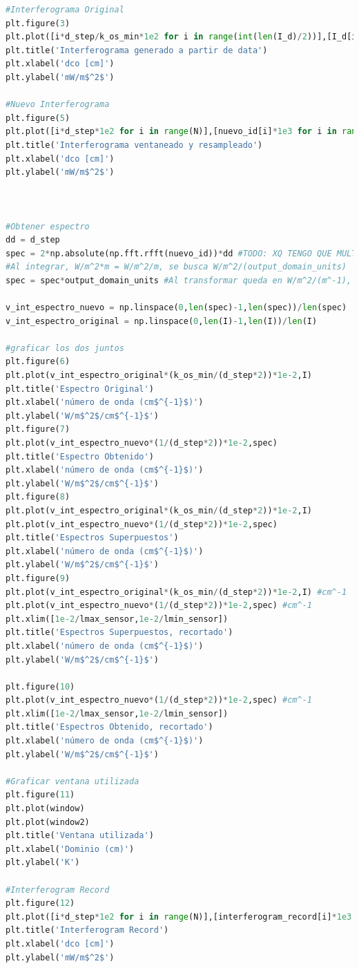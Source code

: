 \documentclass[11pt,titlepage]{article}
\begin{document}
\begin{lstlisting}[language=Python, caption=Python example]
#Interferograma Original
plt.figure(3)
plt.plot([i*d_step/k_os_min*1e2 for i in range(int(len(I_d)/2))],[I_d[i]*1e3 for i in range(int(len(I_d)/2))])
plt.title('Interferograma generado a partir de data')
plt.xlabel('dco [cm]')
plt.ylabel('mW/m$^2$')

#Nuevo Interferograma
plt.figure(5)
plt.plot([i*d_step*1e2 for i in range(N)],[nuevo_id[i]*1e3 for i in range(N)])
plt.title('Interferograma ventaneado y resampleado')
plt.xlabel('dco [cm]')
plt.ylabel('mW/m$^2$')



#Obtener espectro
dd = d_step
spec = 2*np.absolute(np.fft.rfft(nuevo_id))*dd #TODO: XQ TENGO QUE MULTIPLICAR POR DOS?
#Al integrar, W/m^2*m = W/m^2/m, se busca W/m^2/(output_domain_units)
spec = spec*output_domain_units #Al transformar queda en W/m^2/(m^-1), convertir en W/m^2/(output_domain_units)

v_int_espectro_nuevo = np.linspace(0,len(spec)-1,len(spec))/len(spec)
v_int_espectro_original = np.linspace(0,len(I)-1,len(I))/len(I)

#graficar los dos juntos
plt.figure(6)
plt.plot(v_int_espectro_original*(k_os_min/(d_step*2))*1e-2,I)
plt.title('Espectro Original')
plt.xlabel('número de onda (cm$^{-1}$)')
plt.ylabel('W/m$^2$/cm$^{-1}$')
plt.figure(7)
plt.plot(v_int_espectro_nuevo*(1/(d_step*2))*1e-2,spec)
plt.title('Espectro Obtenido')
plt.xlabel('número de onda (cm$^{-1}$)')
plt.ylabel('W/m$^2$/cm$^{-1}$')
plt.figure(8)
plt.plot(v_int_espectro_original*(k_os_min/(d_step*2))*1e-2,I)
plt.plot(v_int_espectro_nuevo*(1/(d_step*2))*1e-2,spec)
plt.title('Espectros Superpuestos')
plt.xlabel('número de onda (cm$^{-1}$)')
plt.ylabel('W/m$^2$/cm$^{-1}$')
plt.figure(9)
plt.plot(v_int_espectro_original*(k_os_min/(d_step*2))*1e-2,I) #cm^-1
plt.plot(v_int_espectro_nuevo*(1/(d_step*2))*1e-2,spec) #cm^-1
plt.xlim([1e-2/lmax_sensor,1e-2/lmin_sensor])
plt.title('Espectros Superpuestos, recortado')
plt.xlabel('número de onda (cm$^{-1}$)')
plt.ylabel('W/m$^2$/cm$^{-1}$')

plt.figure(10)
plt.plot(v_int_espectro_nuevo*(1/(d_step*2))*1e-2,spec) #cm^-1
plt.xlim([1e-2/lmax_sensor,1e-2/lmin_sensor])
plt.title('Espectros Obtenido, recortado')
plt.xlabel('número de onda (cm$^{-1}$)')
plt.ylabel('W/m$^2$/cm$^{-1}$')

#Graficar ventana utilizada
plt.figure(11)
plt.plot(window)
plt.plot(window2)
plt.title('Ventana utilizada')
plt.xlabel('Dominio (cm)')
plt.ylabel('K')

#Interferogram Record
plt.figure(12)
plt.plot([i*d_step*1e2 for i in range(N)],[interferogram_record[i]*1e3 for i in range(N)])
plt.title('Interferogram Record')
plt.xlabel('dco [cm]')
plt.ylabel('mW/m$^2$')

\end{lstlisting}
\end{document}
